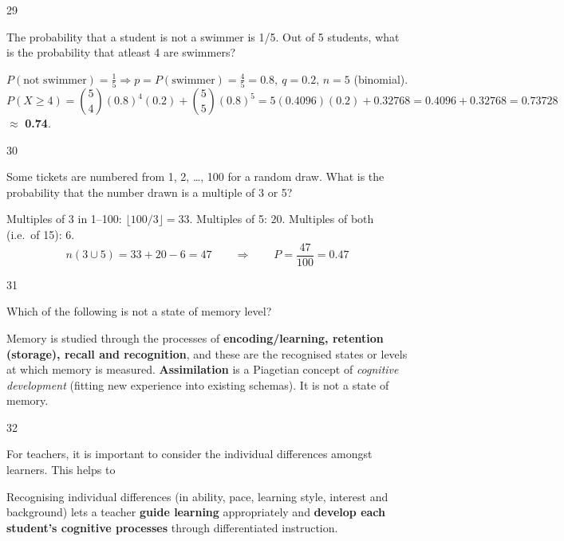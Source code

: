\begin{question}{29}
{The probability that a student is not a swimmer is 1/5. Out of 5 students, what is the probability that atleast 4 are swimmers?\par}
\begin{explain}
$P(\text{not swimmer})=\tfrac15 \Rightarrow p=P(\text{swimmer})=\tfrac45=0.8,\ q=0.2$, $n=5$ (binomial).
\[P(X\ge4)=\binom54(0.8)^4(0.2)+\binom55(0.8)^5=5(0.4096)(0.2)+0.32768=0.4096+0.32768=0.73728\]
$\approx$ \textbf{0.74}.
\end{explain}
\end{question}

\begin{question}{30}
{Some tickets are numbered from 1, 2, \ldots{}, 100 for a random draw. What is the probability that the number drawn is a multiple of 3 or 5?\par}
\begin{explain}
Multiples of 3 in 1--100: $\lfloor100/3\rfloor=33$. Multiples of 5: $20$. Multiples of both (i.e.\ of 15): $6$.
\[n(3\cup5)=33+20-6=47\qquad\Rightarrow\qquad P=\frac{47}{100}=\mathbf{0.47}\]
\end{explain}
\end{question}

\begin{question}{31}
{Which of the following is not a state of memory level?\par}
\begin{explain}
Memory is studied through the processes of \textbf{encoding/learning, retention (storage), recall and recognition}, and these are the recognised states or levels at which memory is measured. \textbf{Assimilation} is a Piagetian concept of \emph{cognitive development} (fitting new experience into existing schemas). It is not a state of memory.
\end{explain}
\end{question}

\begin{question}{32}
{For teachers, it is important to consider the individual differences amongst learners. This helps to\par}
\begin{explain}
Recognising individual differences (in ability, pace, learning style, interest and background) lets a teacher \textbf{guide learning} appropriately and \textbf{develop each student's cognitive processes} through differentiated instruction.
\end{explain}
\end{question}

